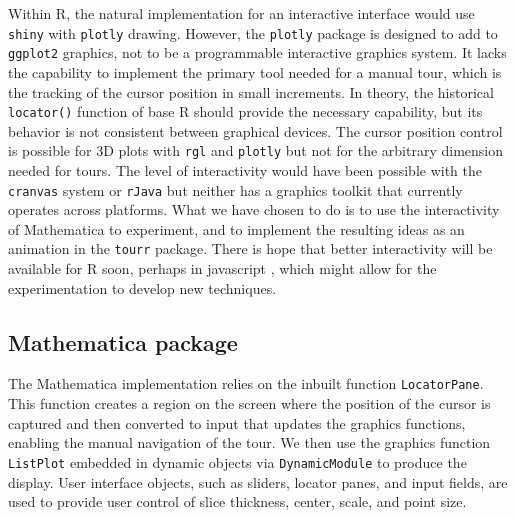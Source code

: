 \documentclass[]{interact}
\theoremstyle{plain}%
\theoremstyle{definition}
\theoremstyle{remark}
\begin{document}
Within R, the natural implementation for an interactive interface would
use \texttt{shiny} \citep{shinym} with \texttt{plotly} \citep{plotly}
drawing. However, the \texttt{plotly} package is designed to add to
\texttt{ggplot2} \citep{ggplot2} graphics, not to be a programmable
interactive graphics system. It lacks the capability to implement the
primary tool needed for a manual tour, which is the tracking of the
cursor position in small increments. In theory, the historical
\texttt{locator()} function of base R should provide the necessary
capability, but its behavior is not consistent between graphical
devices. The cursor position control is possible for 3D plots with
\texttt{rgl} \citep{rgl} and \texttt{plotly} but not for the arbitrary
dimension needed for tours. The level of interactivity would have been
possible with the \texttt{cranvas} system \citep{cranvas} or
\texttt{rJava} \citep{rJava} but neither has a graphics toolkit that
currently operates across platforms. What we have chosen to do is to use
the interactivity of Mathematica to experiment, and to implement the
resulting ideas as an animation in the \texttt{tourr} \citep{tourr}
package. There is hope that better interactivity will be available for R
soon, perhaps in javascript \citep[e.g.][\citet{detourr}]{langevitour},
which might allow for the experimentation to develop new techniques.

\hypertarget{mathematica-package}{%
\subsection{Mathematica package}\label{mathematica-package}}

The Mathematica implementation relies on the inbuilt function
\texttt{LocatorPane}. This function creates a region on the screen where
the position of the cursor is captured and then converted to input that
updates the graphics functions, enabling the manual navigation of the
tour. We then use the graphics function \texttt{ListPlot} embedded in
dynamic objects via \texttt{DynamicModule} to produce the display. User
interface objects, such as sliders, locator panes, and input fields, are
used to provide user control of slice thickness, center, scale, and
point size.
\end{document}
